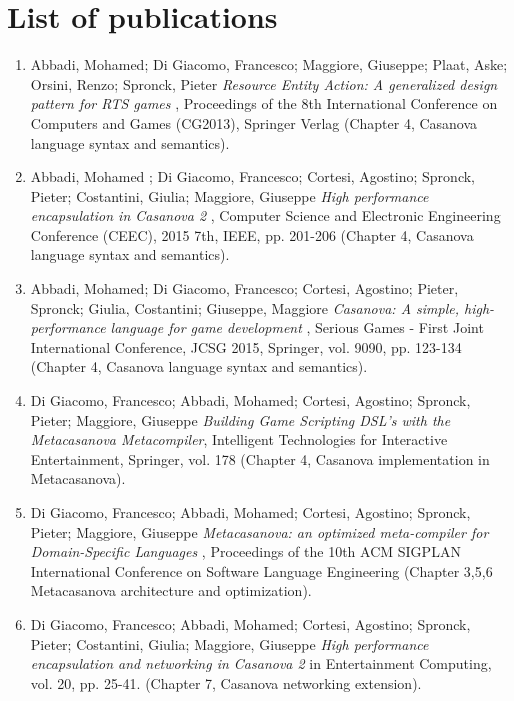 \chapter*{List of publications}

\begin{enumerate}
\item Abbadi, Mohamed; Di Giacomo, Francesco; Maggiore, Giuseppe; Plaat, Aske; Orsini, Renzo; Spronck, Pieter \textit{Resource Entity Action: A generalized design pattern for RTS games} , Proceedings of the 8th International Conference on Computers and Games (CG2013), Springer Verlag (Chapter 4, Casanova language syntax and semantics).
\item Abbadi, Mohamed ; Di Giacomo, Francesco; Cortesi, Agostino; Spronck, Pieter; Costantini, Giulia; Maggiore, Giuseppe \textit{High performance encapsulation in Casanova 2} , Computer Science and Electronic Engineering Conference (CEEC), 2015 7th, IEEE, pp. 201-206 (Chapter 4, Casanova language syntax and semantics).
\item Abbadi, Mohamed; Di Giacomo, Francesco; Cortesi, Agostino; Pieter, Spronck; Giulia, Costantini; Giuseppe, Maggiore \textit{Casanova: A simple, high-performance language for game development} , Serious Games - First Joint International Conference, JCSG 2015, Springer, vol. 9090, pp. 123-134 (Chapter 4, Casanova language syntax and semantics).
\item Di Giacomo, Francesco; Abbadi, Mohamed; Cortesi, Agostino; Spronck, Pieter; Maggiore, Giuseppe \textit{Building Game Scripting DSL’s with the Metacasanova Metacompiler}, Intelligent Technologies for Interactive Entertainment, Springer, vol. 178 (Chapter 4, Casanova implementation in Metacasanova).
\item Di Giacomo, Francesco; Abbadi, Mohamed; Cortesi, Agostino; Spronck, Pieter; Maggiore, Giuseppe \textit{Metacasanova: an optimized meta-compiler for Domain-Specific Languages} , Proceedings of the 10th ACM SIGPLAN International Conference on Software Language Engineering (Chapter 3,5,6 Metacasanova architecture and optimization).
\item Di Giacomo, Francesco; Abbadi, Mohamed; Cortesi, Agostino; Spronck, Pieter; Costantini, Giulia; Maggiore, Giuseppe \textit{High performance encapsulation and networking in Casanova 2} in Entertainment Computing, vol. 20, pp. 25-41. (Chapter 7, Casanova networking extension).
\end{enumerate}